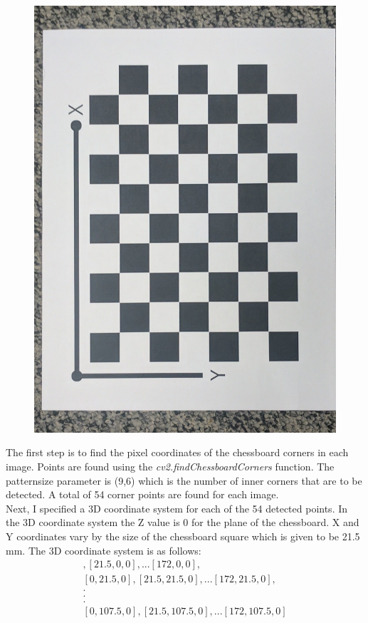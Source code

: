 \documentclass[conference]{IEEEtran}
\begin{document}
\begin{figure}[H]
\centering
\includegraphics[scale = 0.15]{1.jpg}
\label{fig_sim}
\end{figure}

The first step is to find the pixel coordinates of the chessboard corners in each image. Points are found using the \textit{cv2.findChessboardCorners} function. The patternsize parameter is (9,6) which is the number of inner corners that are to be detected. A total of 54 corner points are found for each image.\\

Next, I specified a 3D coordinate system for each of the  54 detected points. In the 3D coordinate system the Z value is 0 for the plane of the chessboard. X and Y coordinates vary by the size of the chessboard square which is given to be 21.5 mm. The 3D coordinate system is as follows:
\begin{align*}
[0, 0, 0], [21.5, 0, 0], ... [172, 0, 0],  \\
[0, 21.5, 0], [21.5, 21.5, 0], ... [172, 21.5, 0],\\
.\\
.\\
.\\
[0, 107.5, 0], [21.5, 107.5, 0], ... [172, 107.5, 0]
\end{align*}
\end{document}

